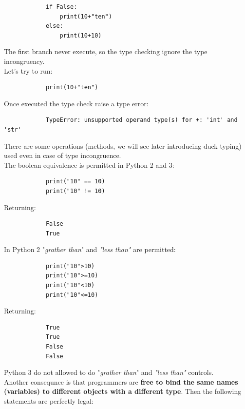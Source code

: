 \documentclass[12pt]{article}
\begin{document}
		\begin{lstlisting}
			if False:
				print(10+"ten") 
			else:
				print(10+10)
		\end{lstlisting}
		
		The first branch never execute, so the type checking ignore the type incongruency.\\
		Let's try to run:
		
		\begin{lstlisting}
			print(10+"ten")
		\end{lstlisting}
		
		Once executed the type check raise a type error:
		
		\begin{lstlisting}
			TypeError: unsupported operand type(s) for +: 'int' and 'str'
		\end{lstlisting}
		
		There are some operations (methods, we will see later introducing duck typing) used even in case of type incongruence. \\
		The boolean equivalence is permitted in Python 2 and 3: 
		
		\begin{lstlisting}
			print("10" == 10)
			print("10" != 10)
		\end{lstlisting}
		
		Returning:
		
		\begin{lstlisting}
			False
			True
		\end{lstlisting}
		
		In Python 2 "\textit{grather than}" and \textit{"less than"} are permitted:
		
		\begin{lstlisting}
			print("10">10)
			print("10">=10)
			print("10"<10)
			print("10"<=10)
		\end{lstlisting}
		
		Returning:
		
		\begin{lstlisting}
			True
			True
			False
			False
		\end{lstlisting}
		
		Python 3 do not allowed to do "\textit{grather than}" and \textit{"less than"} controls.\\
		
		Another consequnce is that programmers are \textbf{free to bind the same names (variables) to different objects with a different type}. Then the following statements are perfectly legal:
		
\end{document}
